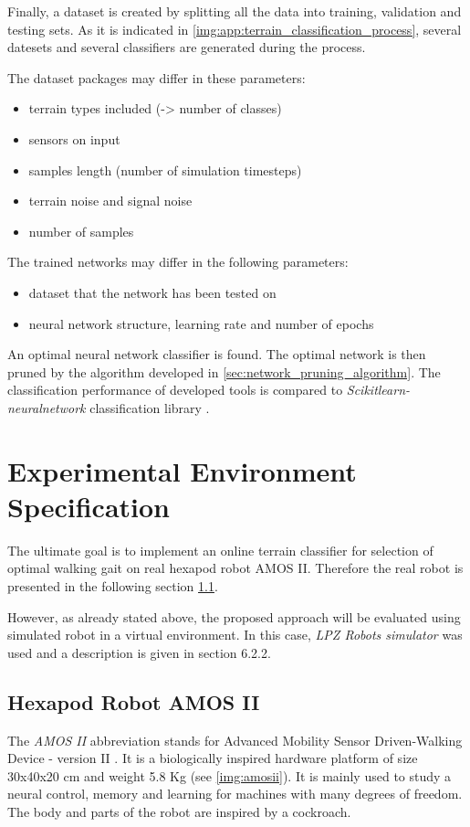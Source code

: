 Finally, a dataset is created by splitting all the data into training, validation and testing sets. As it is indicated in \cref{img:app:terrain_classification_process}, several datesets and several classifiers are generated during the process. 

The dataset packages may differ in these parameters:
\begin{itemize}
\item terrain types included (-> number of classes)
\item sensors on input
\item samples length (number of simulation timesteps)
\item terrain noise and signal noise
\item number of samples
\end{itemize}

The trained networks may differ in the following parameters:
\begin{itemize}
\item dataset that the network has been tested on
\item neural network structure, learning rate and number of epochs
\end{itemize}

An optimal neural network classifier is found. The optimal network is then pruned by the algorithm developed in \cref{sec:network_pruning_algorithm}. The classification performance of developed tools is compared to \textit{Scikitlearn-neuralnetwork} classification library \citep{misc:sknn}.

\section{Experimental Environment Specification}
The ultimate goal is to implement an online terrain classifier for selection of optimal walking gait on real hexapod robot AMOS II. Therefore the real robot is presented in the following section \ref{ssec:amosii}.

However, as already stated above, the proposed approach will be evaluated using simulated robot in a virtual environment. In this case, \textit{LPZ Robots simulator} \citep{misc:lpzrobots} was used and a description is given in section 6.2.2.

\subsection{Hexapod Robot AMOS II} \label{ssec:amosii}
The \textit{AMOS II} abbreviation stands for Advanced Mobility Sensor Driven-Walking Device - version II \citep{misc:amosii}. It is a biologically inspired hardware platform of size 30x40x20 cm and weight 5.8 Kg (see \cref{img:amosii}). It is mainly used to study a neural control, memory and learning for machines with many degrees of freedom. The body and parts of the robot are inspired by a cockroach.

